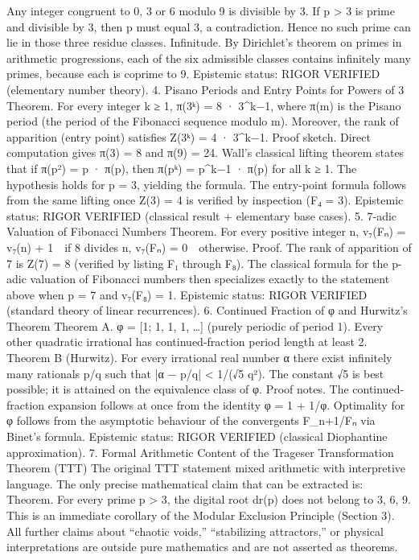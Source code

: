 Any integer congruent to 0, 3 or 6 modulo 9 is divisible by 3.
If p > 3 is prime and divisible by 3, then p must equal 3, a contradiction.
Hence no such prime can lie in those three residue classes.
Infinitude.
By Dirichlet’s theorem on primes in arithmetic progressions, each of the six admissible classes contains infinitely many primes, because each is coprime to 9.
Epistemic status:
RIGOR VERIFIED (elementary number theory).
4. Pisano Periods and Entry Points for Powers of 3
Theorem.
For every integer k ≥ 1,
π(3ᵏ) = 8 · 3^{k−1},
where π(m) is the Pisano period (the period of the Fibonacci sequence modulo m).
Moreover, the rank of apparition (entry point) satisfies
Z(3ᵏ) = 4 · 3^{k−1}.
Proof sketch.
Direct computation gives π(3) = 8 and π(9) = 24.
Wall’s classical lifting theorem states that if π(p²) = p · π(p), then π(pᵏ) = p^{k−1} · π(p) for all k ≥ 1.
The hypothesis holds for p = 3, yielding the formula.
The entry-point formula follows from the same lifting once Z(3) = 4 is verified by inspection (F₄ = 3).
Epistemic status:
RIGOR VERIFIED (classical result + elementary base cases).
5. 7-adic Valuation of Fibonacci Numbers
Theorem.
For every positive integer n,
v₇(Fₙ) = v₇(n) + 1 if 8 divides n,
v₇(Fₙ) = 0 otherwise.
Proof.
The rank of apparition of 7 is Z(7) = 8 (verified by listing F₁ through F₈).
The classical formula for the p-adic valuation of Fibonacci numbers then specializes exactly to the statement above when p = 7 and v₇(F₈) = 1.
Epistemic status:
RIGOR VERIFIED (standard theory of linear recurrences).
6. Continued Fraction of φ and Hurwitz’s Theorem
Theorem A.
φ = [1; 1, 1, 1, …] (purely periodic of period 1).
Every other quadratic irrational has continued-fraction period length at least 2.
Theorem B (Hurwitz).
For every irrational real number α there exist infinitely many rationals p/q such that
|α − p/q| < 1/(√5 q²).
The constant √5 is best possible; it is attained on the equivalence class of φ.
Proof notes.
The continued-fraction expansion follows at once from the identity φ = 1 + 1/φ.
Optimality for φ follows from the asymptotic behaviour of the convergents F_{n+1}/Fₙ via Binet’s formula.
Epistemic status:
RIGOR VERIFIED (classical Diophantine approximation).
7. Formal Arithmetic Content of the Trageser Transformation Theorem (TTT)
The original TTT statement mixed arithmetic with interpretive language. The only precise mathematical claim that can be extracted is:
Theorem.
For every prime p > 3, the digital root dr(p) does not belong to {3, 6, 9}.
This is an immediate corollary of the Modular Exclusion Principle (Section 3).
All further claims about “chaotic voids,” “stabilizing attractors,” or physical interpretations are outside pure mathematics and are not asserted as theorems.
